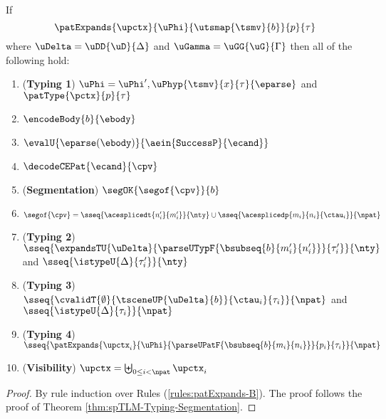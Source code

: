 \begin{theorem}
\label{thm:spTLM-Typing-Segmentation-B}
If \[\patExpands{\upctx}{\uPhi}{\utsmap{\tsmv}{b}}{p}{\tau}\] where $\uDelta=\uDD{\uD}{\Delta}$ and $\uGamma=\uGG{\uG}{\Gamma}$ then all of the following hold:
\begin{enumerate}
        \item (\textbf{Typing 1}) $\uPhi=\uPhi', \uPhyp{\tsmv}{x}{\tau}{\eparse}$ and $\patType{\pctx}{p}{\tau}$
        \item $\encodeBody{b}{\ebody}$
        \item $\evalU{\eparse(\ebody)}{\aein{\mathtt{SuccessP}}{\ecand}}$
        \item $\decodeCEPat{\ecand}{\cpv}$
        \item (\textbf{Segmentation}) $\segOK{\segof{\cpv}}{b}$
        \item $\segof{\cpv} = \sseq{\acesplicedt{n'_i}{m'_i}}{\nty} \cup \sseq{\acesplicedp{m_i}{n_i}{\ctau_i}}{\npat}$
        \item (\textbf{Typing 2}) $\sseq{
              \expandsTU{\uDelta}
              {
                \parseUTypF{\bsubseq{b}{m'_i}{n'_i}}
              }{\tau'_i}
            }{\nty}$ and $\sseq{\istypeU{\Delta}{\tau'_i}}{\nty}$
        \item (\textbf{Typing 3}) $\sseq{
          \cvalidT{\emptyset}{
            \tsceneUP
              {\uDelta}{b}
          }{
            \ctau_i
          }{\tau_i}
        }{\npat}$ and $\sseq{\istypeU{\Delta}{\tau_i}}{\npat}$
        \item (\textbf{Typing 4}) $\sseq{
          \patExpands
            {\upctx_i}
            {\uPhi}
            {\parseUPatF{\bsubseq{b}{m_i}{n_i}}}
            {p_i}
            {\tau_i}
        }{\npat}$ 
      \item (\textbf{Visibility}) $\upctx = \biguplus_{0 \leq i < \npat} \upctx_i$
\end{enumerate}
\end{theorem}
\begin{proof} By rule induction over Rules (\ref{rules:patExpands-B}). The proof follows the proof of Theorem \ref{thm:spTLM-Typing-Segmentation}.
\end{proof}

